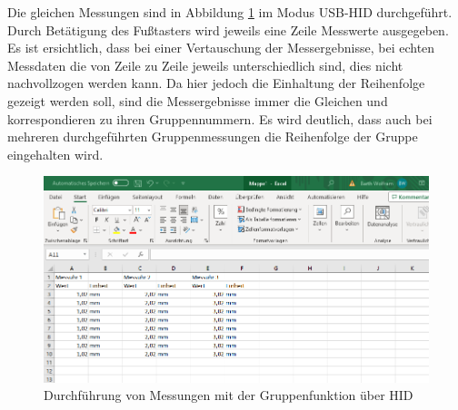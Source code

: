 Die gleichen Messungen sind in Abbildung \ref{fig:MessungenGruppenfunktionHID} im Modus USB-HID durchgeführt. Durch Betätigung des Fußtasters wird jeweils eine Zeile Messwerte ausgegeben. Es ist ersichtlich, dass bei einer Vertauschung der Messergebnisse, bei echten Messdaten die von Zeile zu Zeile jeweils unterschiedlich sind, dies nicht nachvollzogen werden kann. Da hier jedoch die Einhaltung der Reihenfolge gezeigt werden soll, sind die Messergebnisse immer die Gleichen und korrespondieren zu ihren Gruppennummern. Es wird deutlich, dass auch bei mehreren durchgeführten Gruppenmessungen die Reihenfolge der Gruppe eingehalten wird.
\begin{figure}[H] 
	\centering
	\includegraphics[width=\textwidth]{figures/USBHIDGroup.png}
	\caption{Durchführung von Messungen mit der Gruppenfunktion über HID}
	\label{fig:MessungenGruppenfunktionHID}
\end{figure}

